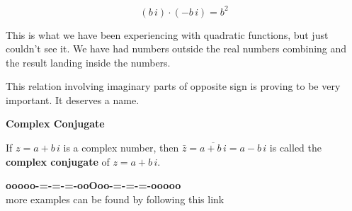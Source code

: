 \documentclass{ximera}
\begin{document}
\[
(b \, i) \cdot (-b \, i) = b^2
\]



This is what we have been experiencing with quadratic functions, but just couldn't see it.  We have had numbers outside the real numbers combining and the result landing inside the numbers.




This relation involving imaginary parts of opposite sign is proving to be very important.  It deserves a name.



\begin{definition} \textbf{\textcolor{green!50!black}{Complex Conjugate}}

If $z = a + b \, i$ is a complex number, then $\bar{z} = \overline{a + b \, i} = a - b \, i$ is called the \textbf{complex conjugate} of $z = a + b \, i$.

\end{definition}
















\begin{center}
\textbf{\textcolor{green!50!black}{ooooo-=-=-=-ooOoo-=-=-=-ooooo}} \\

more examples can be found by following this link\\ 

\end{center}
\end{document}
